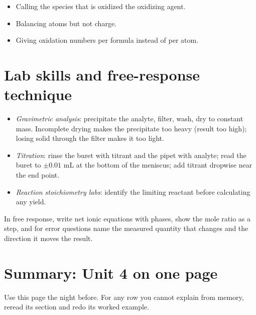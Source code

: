 \documentclass[11pt]{article}
\begin{document}
\errorsh
\begin{itemize}
\item Calling the species that is oxidized the oxidizing agent.
\item Balancing atoms but not charge.
\item Giving oxidation numbers per formula instead of per atom.
\end{itemize}

\section{Lab skills and free-response technique}\label{t:lab}
\begin{itemize}
\item \emph{Gravimetric analysis}: precipitate the analyte, filter, wash, dry to constant mass. Incomplete drying makes the precipitate too heavy (result too high); losing solid through the filter makes it too light.
\item \emph{Titration}: rinse the buret with titrant and the pipet with analyte; read the buret to $\pm0.01$ mL at the bottom of the meniscus; add titrant dropwise near the end point.
\item \emph{Reaction stoichiometry labs}: identify the limiting reactant before calculating any yield.
\end{itemize}
In free response, write net ionic equations with phases, show the mole ratio as a step, and for error questions name the measured quantity that changes and the direction it moves the result.

\clearpage
\section*{Summary: Unit 4 on one page}
Use this page the night before. For any row you cannot explain from memory, reread its section and redo its worked example.
\end{document}

